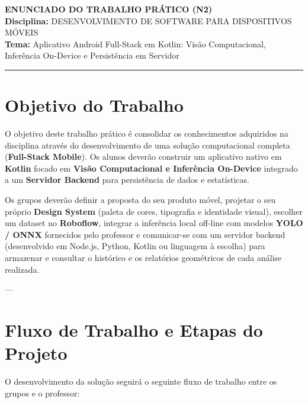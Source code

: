 \documentclass[12pt]{article}
\begin{document}

\begin{center}
    {\Large \textbf{ENUNCIADO DO TRABALHO PRÁTICO (N2)}} \\[0.2cm]
    {\large \textbf{Disciplina:} DESENVOLVIMENTO DE SOFTWARE PARA DISPOSITIVOS MÓVEIS} \\[0.1cm]
    {\small \textbf{Tema:} Aplicativo Android Full-Stack em Kotlin: Visão Computacional, Inferência On-Device e Persistência em Servidor}
\end{center}

\hrule

\vspace{0.3cm}

\section{Objetivo do Trabalho}
O objetivo deste trabalho prático é consolidar os conhecimentos adquiridos na disciplina através do desenvolvimento de uma solução computacional completa (\textbf{Full-Stack Mobile}). Os alunos deverão construir um aplicativo nativo em \textbf{Kotlin} focado em \textbf{Visão Computacional e Inferência On-Device} integrado a um \textbf{Servidor Backend} para persistência de dados e estatísticas.

Os grupos deverão definir a proposta do seu produto móvel, projetar o seu próprio \textbf{Design System} (paleta de cores, tipografia e identidade visual), escolher um dataset no \textbf{Roboflow}, integrar a inferência local off-line com modelos \textbf{YOLO / ONNX} fornecidos pelo professor e comunicar-se com um servidor backend (desenvolvido em Node.js, Python, Kotlin ou linguagem à escolha) para armazenar e consultar o histórico e os relatórios geométricos de cada análise realizada.

---

\section{Fluxo de Trabalho e Etapas do Projeto}

O desenvolvimento da solução seguirá o seguinte fluxo de trabalho entre os grupos e o professor:
\end{document}
